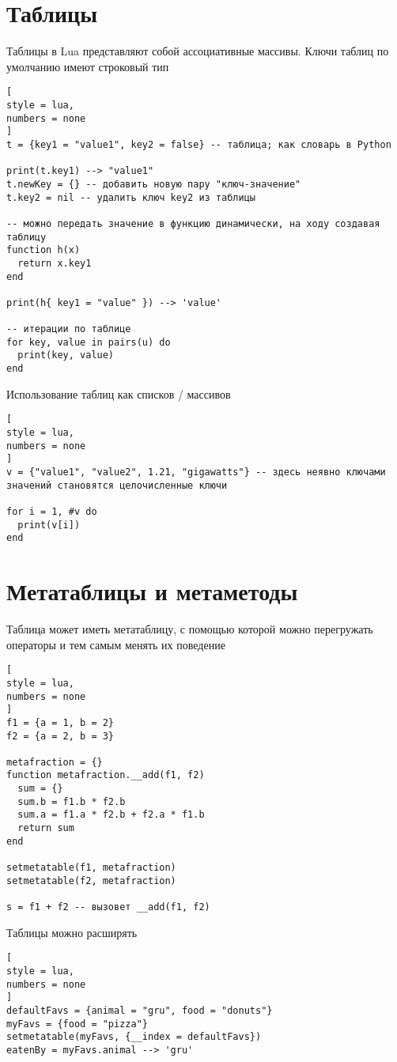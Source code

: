 \documentclass[%
	11pt,
	a4paper,
	utf8,
		]{article}
\begin{document}
\section{Таблицы}

Таблицы в Lua представляют собой ассоциативные массивы. Ключи таблиц по умолчанию имеют строковый тип
\begin{lstlisting}[
style = lua,
numbers = none	
]
t = {key1 = "value1", key2 = false} -- таблица; как словарь в Python

print(t.key1) --> "value1"
t.newKey = {} -- добавить новую пару "ключ-значение"
t.key2 = nil -- удалить ключ key2 из таблицы

-- можно передать значение в функцию динамически, на ходу создавая таблицу
function h(x)
  return x.key1
end

print(h{ key1 = "value" }) --> 'value'

-- итерации по таблице
for key, value in pairs(u) do
  print(key, value)
end
\end{lstlisting}

Использование таблиц как списков / массивов
\begin{lstlisting}[
style = lua,
numbers = none
]
v = {"value1", "value2", 1.21, "gigawatts"} -- здесь неявно ключами значений становятся целочисленные ключи

for i = 1, #v do
  print(v[i])
end
\end{lstlisting}

\section{Метатаблицы и метаметоды}

Таблица может иметь метатаблицу, с помощью которой можно перегружать операторы и тем самым менять их поведение
\begin{lstlisting}[
style = lua,
numbers = none	
]
f1 = {a = 1, b = 2}
f2 = {a = 2, b = 3}

metafraction = {}
function metafraction.__add(f1, f2)
  sum = {}
  sum.b = f1.b * f2.b
  sum.a = f1.a * f2.b + f2.a * f1.b
  return sum
end

setmetatable(f1, metafraction)
setmetatable(f2, metafraction)

s = f1 + f2 -- вызовет __add(f1, f2)
\end{lstlisting}

Таблицы можно расширять
\begin{lstlisting}[
style = lua,
numbers = none
]
defaultFavs = {animal = "gru", food = "donuts"}
myFavs = {food = "pizza"}
setmetatable(myFavs, {__index = defaultFavs})
eatenBy = myFavs.animal --> 'gru'
\end{lstlisting}
\end{document}
